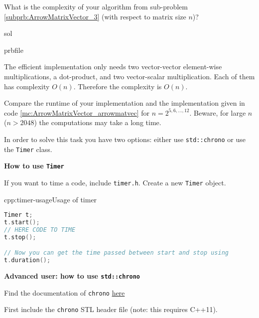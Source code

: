 \begin{samproblem}
\begin{subproblem}{}
What is the complexity of your algorithm from sub-problem
\ref{subprb:ArrowMatrixVector_3} (with respect to matrix size $n$)?
\begin{samwriteprbpart}{sol}
    \begin{writeverbatim}{prbfile}
\begin{samsolution}
  The efficient implementation only needs two vector-vector element-wise
  multiplications, a dot-product, and
  two vector-scalar multiplication. Each of them has complexity $O(n)$.
  Therefore the complexity is $O(n)$.
\end{samsolution}
\end{writeverbatim}
\end{samwriteprbpart}

\end{subproblem}

\begin{subproblem}{}
  Compare the runtime of your implementation and the implementation given in code
  \ref{mc:ArrowMatrixVector_arrowmatvec} for $n=2^{5,6,\ldots,12}$.
  Beware, for large $n$ ($n > 2048$) the computations may take a long time.

  In order to solve this task you have two options: either use \texttt{std::chrono} or use the \texttt{Timer} class.

  \textbf{How to use \texttt{Timer}}

  If you want to time a code, include \texttt{timer.h}.
  Create a new \texttt{Timer} object.
  \begin{samcode}[C++11-code]{cpp:timer-usage}{Usage of timer}
    \begin{lstlisting}[language=C++, style=cpp]
Timer t;
t.start();
// HERE CODE TO TIME
t.stop();

// Now you can get the time passed between start and stop using
t.duration();
    \end{lstlisting}
  \end{samcode}

  \textbf{Advanced user: how to use \texttt{std::chrono}}

  Find the documentation of \texttt{chrono} \href{http://en.cppreference.com/w/cpp/chrono/high_resolution_clock}{here}

  First include the \texttt{chrono} STL header file (note: this requires C++11).


\end{subproblem}
\end{samproblem}
